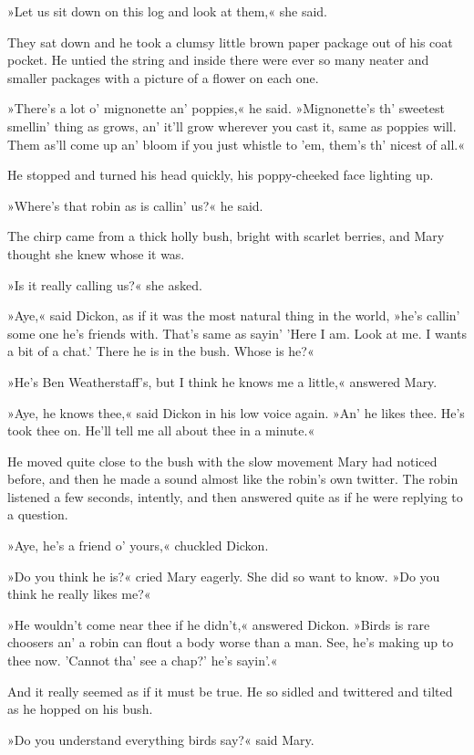 »Let us sit down on this log and look at them,« she said.

They sat down and he took a clumsy little brown paper package out of his coat pocket. He untied the string and inside there were ever so many neater and smaller packages with a picture of a flower on each one.

»There's a lot o' mignonette an' poppies,« he said. »Mignonette's th' sweetest smellin' thing as grows, an' it'll grow wherever you cast it, same as poppies will. Them as'll come up an' bloom if you just whistle to 'em, them's th' nicest of all.«

He stopped and turned his head quickly, his poppy-cheeked face lighting up.

»Where's that robin as is callin' us?« he said.

The chirp came from a thick holly bush, bright with scarlet berries, and Mary thought she knew whose it was.

»Is it really calling us?« she asked.

»Aye,« said Dickon, as if it was the most natural thing in the world, »he's callin' some one he's friends with. That's same as sayin' 'Here I am. Look at me. I wants a bit of a chat.' There he is in the bush. Whose is he?«

»He's Ben Weatherstaff's, but I think he knows me a little,« answered Mary.

»Aye, he knows thee,« said Dickon in his low voice again. »An' he likes thee. He's took thee on. He'll tell me all about thee in a minute.«

He moved quite close to the bush with the slow movement Mary had noticed before, and then he made a sound almost like the robin's own twitter. The robin listened a few seconds, intently, and then answered quite as if he were replying to a question.

»Aye, he's a friend o' yours,« chuckled Dickon.

»Do you think he is?« cried Mary eagerly. She did so want to know. »Do you think he really likes me?«

»He wouldn't come near thee if he didn't,« answered Dickon. »Birds is rare choosers an' a robin can flout a body worse than a man. See, he's making up to thee now. 'Cannot tha' see a chap?' he's sayin'.«

And it really seemed as if it must be true. He so sidled and twittered and tilted as he hopped on his bush.

»Do you understand everything birds say?« said Mary.

